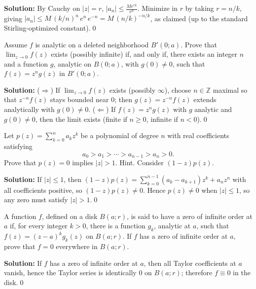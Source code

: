 \noindent\textbf{Solution:}
By Cauchy on $|z|=r$, $|a_n|\le \frac{M e^{r k}}{r^n}$. Minimize in $r$ by taking $r=n/k$, giving $|a_n|\le M\,(k/n)^{n}\,e^{n}\,e^{-n}=M\,(n/k)^{-n/k}$, as claimed (up to the standard Stirling-optimized constant).\qed


\begin{problembox}
Assume \( f \) is analytic on a deleted neighborhood \( B'(0; a) \). Prove that \( \lim_{z \to 0} f(z) \) exists (possibly infinite) if, and only if, there exists an integer \( n \) and a function \( g \), analytic on \( B(0; a) \), with \( g(0) \neq 0 \), such that \( f(z) = z^n g(z) \) in \( B'(0; a) \).
\end{problembox}

\noindent\textbf{Solution:}
($\Rightarrow$) If $\lim_{z\to0}f(z)$ exists (possibly $\infty$), choose $n\in\mathbb Z$ maximal so that $z^{-n}f(z)$ stays bounded near $0$; then $g(z)=z^{-n}f(z)$ extends analytically with $g(0)\ne0$.
($\Leftarrow$) If $f(z)=z^n g(z)$ with $g$ analytic and $g(0)\ne0$, then the limit exists (finite if $n\ge0$, infinite if $n<0$).\qed


\begin{problembox}
Let \( p(z) = \sum_{k=0}^n a_k z^k \) be a polynomial of degree \( n \) with real coefficients satisfying
\[a_0 > a_1 > \cdots > a_{n-1} > a_n > 0.\]
Prove that \( p(z) = 0 \) implies \( |z| > 1 \). Hint. Consider \( (1 - z)p(z) \).
\end{problembox}

\noindent\textbf{Solution:}
If $|z|\le1$, then $(1-z)p(z)=\sum_{k=0}^{n-1}(a_k-a_{k+1})z^k+a_n z^n$ with all coefficients positive, so $(1-z)p(z)\ne0$. Hence $p(z)\ne0$ when $|z|\le1$, so any zero must satisfy $|z|>1$.\qed


\begin{problembox}
A function \( f \), defined on a disk \( B(a; r) \), is said to have a zero of infinite order at \( a \) if, for every integer \( k > 0 \), there is a function \( g_k \), analytic at \( a \), such that \( f(z) = (z - a)^k g_k(z) \) on \( B(a; r) \). If \( f \) has a zero of infinite order at \( a \), prove that \( f = 0 \) everywhere in \( B(a; r) \).
\end{problembox}

\noindent\textbf{Solution:}
If $f$ has a zero of infinite order at $a$, then all Taylor coefficients at $a$ vanish, hence the Taylor series is identically $0$ on $B(a;r)$; therefore $f\equiv0$ in the disk.\qed


